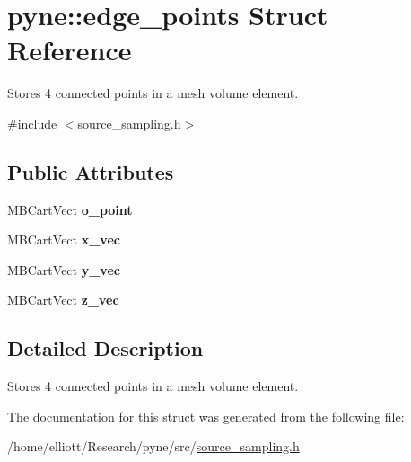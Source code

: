 \hypertarget{structpyne_1_1edge__points}{\section{pyne\-:\-:edge\-\_\-points Struct Reference}
\label{structpyne_1_1edge__points}
}


Stores 4 connected points in a mesh volume element.  




{\ttfamily \#include $<$source\-\_\-sampling.\-h$>$}

\subsection*{Public Attributes}
\begin{DoxyCompactItemize}
\item 
\hypertarget{structpyne_1_1edge__points_a4289acb1ad63358dae33259a58c26eae}{M\-B\-Cart\-Vect {\bfseries o\-\_\-point}}\label{structpyne_1_1edge__points_a4289acb1ad63358dae33259a58c26eae}

\item 
\hypertarget{structpyne_1_1edge__points_abb453892d25c56ff77f81f2d46acfe01}{M\-B\-Cart\-Vect {\bfseries x\-\_\-vec}}\label{structpyne_1_1edge__points_abb453892d25c56ff77f81f2d46acfe01}

\item 
\hypertarget{structpyne_1_1edge__points_a624251a41b0119e753ee5fefc5bdcc88}{M\-B\-Cart\-Vect {\bfseries y\-\_\-vec}}\label{structpyne_1_1edge__points_a624251a41b0119e753ee5fefc5bdcc88}

\item 
\hypertarget{structpyne_1_1edge__points_af38a69fcf9948fd9bd65bcd4ffe3e8c1}{M\-B\-Cart\-Vect {\bfseries z\-\_\-vec}}\label{structpyne_1_1edge__points_af38a69fcf9948fd9bd65bcd4ffe3e8c1}

\end{DoxyCompactItemize}


\subsection{Detailed Description}
Stores 4 connected points in a mesh volume element. 

The documentation for this struct was generated from the following file\-:\begin{DoxyCompactItemize}
\item 
/home/elliott/\-Research/pyne/src/\hyperlink{source__sampling_8h}{source\-\_\-sampling.\-h}\end{DoxyCompactItemize}
